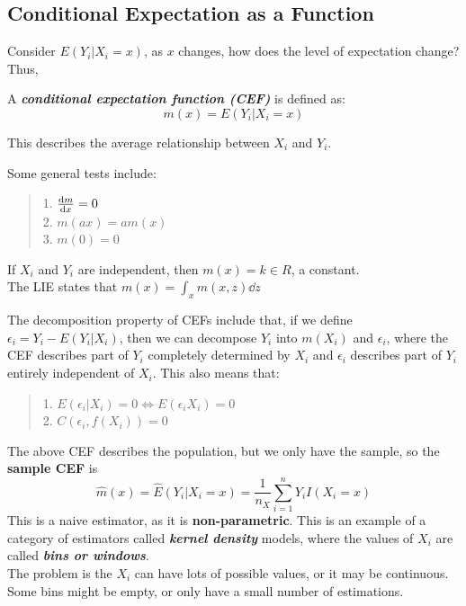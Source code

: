\subsection{Conditional Expectation as a Function}
Consider $E(Y_i | X_i = x)$, as $x$ changes, how does the level of expectation change? Thus,
\begin{definition}
    A \textbf{\textit{conditional expectation function (CEF)}} is defined as:
    $$m(x) = E(Y_i | X_i = x)$$
\end{definition}
This describes the average relationship between $X_i$ and $Y_i$.

Some general tests include:
\begin{quote}
    1. $\dv{m}{x} = 0$ \\
    2. $m(ax) = am(x)$ \\
    3. $m(0) = 0$
\end{quote}

If $X_i$ and $Y_i$ are independent, then $m(x) = k \in R$, a constant. \\
The LIE states that $m(x) = \int_x m(x, z) \dd z$

The decomposition property of CEFs include that, if we define $\epsilon_i = Y_i - E(Y_i | X_i)$, then we can decompose $Y_i$ into $m(X_i)$ and $\epsilon_i$, where the CEF describes part of $Y_i$ completely determined by $X_i$ and $\epsilon_i$ describes part of $Y_i$ entirely independent of $X_i$. This also means that:
\begin{quote}
    1. $E(\epsilon_i | X_i) = 0 \iff E(\epsilon_i X_i) = 0$ \\
    2. $C(\epsilon_i, f(X_i)) = 0$
\end{quote}

The above CEF describes the population, but we only have the sample, so the \textbf{sample CEF} is
$$\hat{m}(x) = \hat{E}(Y_i | X_i = x) = \frac{1}{n_X} \sum_{i=1}^{n} Y_i I(X_i = x)$$
This is a naive estimator, as it is \textbf{non-parametric}. This is an example of a category of estimators called \textbf{\textit{kernel density}} models, where the values of $X_i$ are called \textbf{\textit{bins or windows}}. \\
The problem is the $X_i$ can have lots of possible values, or it may be continuous. Some bins might be empty, or only have a small number of estimations.

